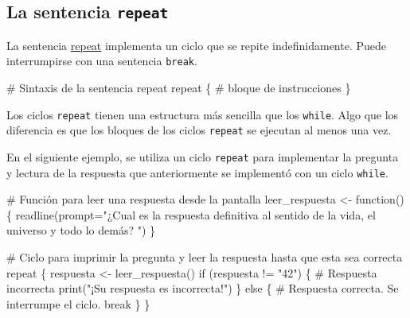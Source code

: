 \documentclass[
  letterpaper,
  DIV=11,
  numbers=noendperiod]{scrreprt}
\newenvironment{Shaded}{\begin{snugshade}}{\end{snugshade}}
\newcommand{\AttributeTok}[1]{\textcolor[rgb]{0.40,0.45,0.13}{#1}}
\newcommand{\CommentTok}[1]{\textcolor[rgb]{0.37,0.37,0.37}{#1}}
\newcommand{\ControlFlowTok}[1]{\textcolor[rgb]{0.00,0.23,0.31}{#1}}
\newcommand{\FunctionTok}[1]{\textcolor[rgb]{0.28,0.35,0.67}{#1}}
\newcommand{\NormalTok}[1]{\textcolor[rgb]{0.00,0.23,0.31}{#1}}
\newcommand{\OtherTok}[1]{\textcolor[rgb]{0.00,0.23,0.31}{#1}}
\newcommand{\SpecialCharTok}[1]{\textcolor[rgb]{0.37,0.37,0.37}{#1}}
\newcommand{\StringTok}[1]{\textcolor[rgb]{0.13,0.47,0.30}{#1}}
\begin{document}
\hypertarget{la-sentencia-repeat}{%
\subsection{\texorpdfstring{La sentencia
\texttt{repeat}}{La sentencia repeat}}\label{la-sentencia-repeat}}

La sentencia
\href{https://cran.r-project.org/doc/manuals/r-devel/R-lang.html\#repeat}{repeat}
implementa un ciclo que se repite indefinidamente. Puede interrumpirse
con una sentencia \texttt{break}.

\begin{Shaded}
\begin{Highlighting}[]
\CommentTok{\# Sintaxis de la sentencia repeat}
\ControlFlowTok{repeat}\NormalTok{ \{}
  \CommentTok{\# bloque de instrucciones }
\NormalTok{\}}
\end{Highlighting}
\end{Shaded}

Los ciclos \texttt{repeat} tienen una estructura más sencilla que los
\texttt{while}. Algo que los diferencia es que los bloques de los ciclos
\texttt{repeat} se ejecutan al menos una vez.

En el siguiente ejemplo, se utiliza un ciclo \texttt{repeat} para
implementar la pregunta y lectura de la respuesta que anteriormente se
implementó con un ciclo \texttt{while}.

\begin{Shaded}
\begin{Highlighting}[]
\CommentTok{\# Función para leer una respuesta desde la pantalla}
\NormalTok{leer\_respuesta }\OtherTok{\textless{}{-}} \ControlFlowTok{function}\NormalTok{() \{}
  \FunctionTok{readline}\NormalTok{(}\AttributeTok{prompt=}\StringTok{"¿Cual es la respuesta definitiva al sentido de la vida, el universo y todo lo demás? "}\NormalTok{)}
\NormalTok{\}}

\CommentTok{\# Ciclo para imprimir la pregunta y leer la respuesta hasta que esta sea correcta}
\ControlFlowTok{repeat}\NormalTok{ \{}
\NormalTok{  respuesta }\OtherTok{\textless{}{-}} \FunctionTok{leer\_respuesta}\NormalTok{()}
  \ControlFlowTok{if}\NormalTok{ (respuesta }\SpecialCharTok{!=} \StringTok{"42"}\NormalTok{) \{}
    \CommentTok{\# Respuesta incorrecta}
    \FunctionTok{print}\NormalTok{(}\StringTok{"¡Su respuesta es incorrecta!"}\NormalTok{)}
\NormalTok{  \} }\ControlFlowTok{else}\NormalTok{ \{}
    \CommentTok{\# Respuesta correcta. Se interrumpe el ciclo.}
    \ControlFlowTok{break}
\NormalTok{  \}}
\NormalTok{\}}
\end{Highlighting}
\end{Shaded}
\end{document}
